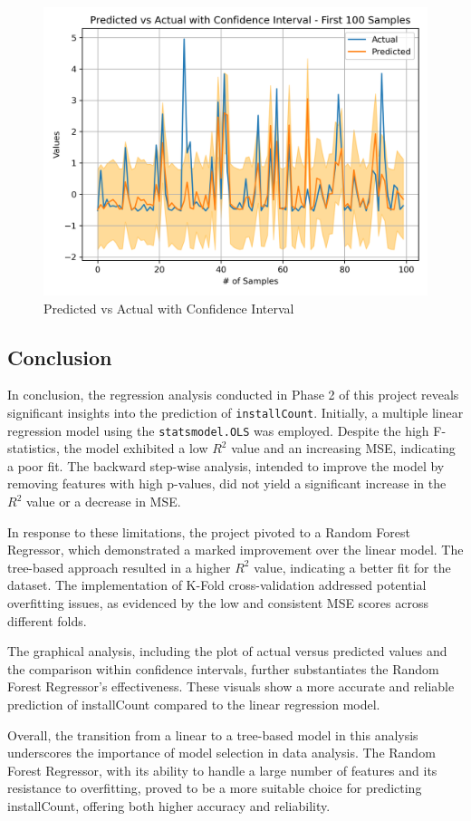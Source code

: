 \begin{figure}
    \centering
    \includegraphics[width=1\linewidth]{docs//assets/regressor_predicted_vs_actual.png}
    \caption{Predicted vs Actual with Confidence Interval}
    \label{fig:rfg-ci}
\end{figure}

\subsection{Conclusion}

In conclusion, the regression analysis conducted in Phase 2 of this project reveals significant insights into the prediction of \texttt{installCount}. Initially, a multiple linear regression model using the \texttt{statsmodel.OLS} was employed. Despite the high F-statistics, the model exhibited a low $R^2$ value and an increasing MSE, indicating a poor fit. The backward step-wise analysis, intended to improve the model by removing features with high p-values, did not yield a significant increase in the $R^2$ value or a decrease in MSE.

In response to these limitations, the project pivoted to a Random Forest Regressor, which demonstrated a marked improvement over the linear model. The tree-based approach resulted in a higher $R^2$ value, indicating a better fit for the dataset. The implementation of K-Fold cross-validation addressed potential overfitting issues, as evidenced by the low and consistent MSE scores across different folds.

The graphical analysis, including the plot of actual versus predicted values and the comparison within confidence intervals, further substantiates the Random Forest Regressor's effectiveness. These visuals show a more accurate and reliable prediction of installCount compared to the linear regression model.

Overall, the transition from a linear to a tree-based model in this analysis underscores the importance of model selection in data analysis. The Random Forest Regressor, with its ability to handle a large number of features and its resistance to overfitting, proved to be a more suitable choice for predicting installCount, offering both higher accuracy and reliability.